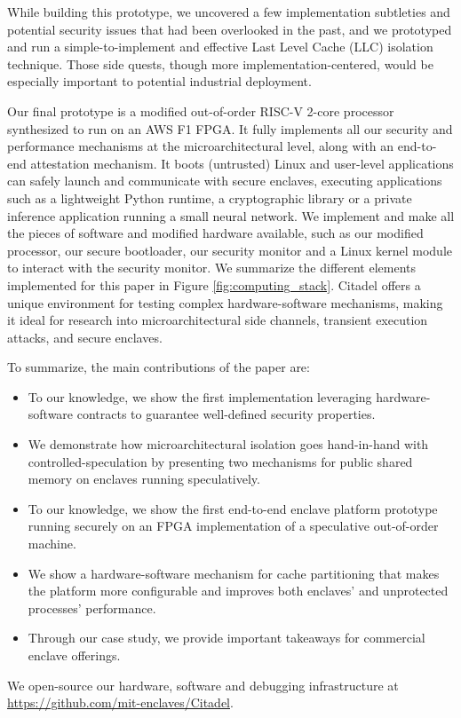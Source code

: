 While building this prototype, we uncovered a few implementation subtleties and potential security issues that had been overlooked in the past, and we prototyped and run a simple-to-implement and effective Last Level Cache (LLC) isolation technique.
Those side quests, though more implementation-centered, would be especially important to potential industrial deployment.

Our final prototype is a modified out-of-order RISC-V 2-core processor synthesized to run on an AWS F1 FPGA.
It fully implements all our security and performance mechanisms at the microarchitectural level, along with an end-to-end attestation mechanism.
It boots (untrusted) Linux and user-level applications can safely launch and communicate with secure enclaves, executing applications such as a lightweight Python runtime, a cryptographic library or a private inference application running a small neural network.
We implement and make all the pieces of software and modified hardware available, such as our modified processor, our secure bootloader, our security monitor and a Linux kernel module to interact with the security monitor.
We summarize the different elements implemented for this paper in Figure \ref{fig:computing_stack}.
Citadel offers a unique environment for testing complex hardware-software mechanisms, making it ideal for research into microarchitectural side channels, transient execution attacks, and secure enclaves.

To summarize, the main contributions of the paper are:
\begin{itemize}
\itemsep-0.1em
\item To our knowledge, we show the first implementation leveraging hardware-software contracts to guarantee well-defined security properties.
\item We demonstrate how microarchitectural isolation goes hand-in-hand with controlled-speculation by presenting two mechanisms for public shared memory on enclaves running speculatively.
\item To our knowledge, we show the first end-to-end enclave platform prototype running securely on an FPGA implementation of a speculative out-of-order machine.
\item We show a hardware-software mechanism for cache partitioning that makes the platform more configurable and improves both enclaves' and unprotected processes' performance.
\item Through our case study, we provide important takeaways for commercial enclave offerings.
\end{itemize}

We open-source our hardware, software and debugging infrastructure at \url{https://github.com/mit-enclaves/Citadel}.